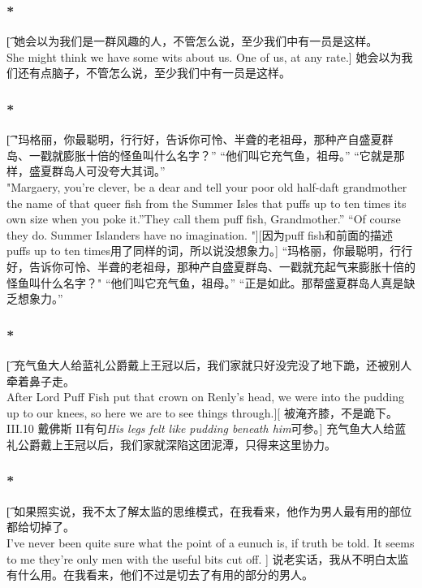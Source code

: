 \documentclass[12pt,a4paper]{article}
\begin{document}
\subsubsection{\color{red}*}\t[
	她会以为我们是一群风趣的人，不管怎么说，至少我们中有一员是这样。\\
	She might think we have some wits about us. One of us, at any rate.]
	她会以为我们还有点脑子，不管怎么说，至少我们中有一员是这样。
	
\subsubsection{\color{red}*}\t[
	"玛格丽，你最聪明，行行好，告诉你可怜、半聋的老祖母，那种产自盛夏群岛、一戳就膨胀十倍的怪鱼叫什么名字？” “他们叫它充气鱼，祖母。” “它就是那样，盛夏群岛人可没夸大其词。”\\
	"Margaery, you're clever, be a dear and tell your poor old half-daft grandmother the name of that queer fish from the Summer Isles that puffs up to ten times its own size when you poke it.”They call them puff fish, Grandmother.” “Of course they do. Summer Islanders have no imagination. "][因为puff fish和前面的描述puffs up to ten times用了同样的词，所以说没想象力。]
	“玛格丽，你最聪明，行行好，告诉你可怜、半聋的老祖母，那种产自盛夏群岛、一戳就充起气来膨胀十倍的怪鱼叫什么名字？" “他们叫它充气鱼，祖母。” “正是如此。那帮盛夏群岛人真是缺乏想象力。”
	
\subsubsection{\color{red}*}\t[
	充气鱼大人给蓝礼公爵戴上王冠以后，我们家就只好没完没了地下跪，还被别人牵着鼻子走。\\
	After Lord Puff Fish put that crown on Renly's head, we were into the pudding up to our knees, so here we are to see things through.][
	被淹齐膝，不是跪下。III.10 戴佛斯 II有句\emph{His legs felt like pudding beneath him}可参。]
	充气鱼大人给蓝礼公爵戴上王冠以后，我们家就深陷这团泥潭，只得来这里协力。
	
\subsubsection{\color{red}*}\t[
	如果照实说，我不太了解太监的思维模式，在我看来，他作为男人最有用的部位都给切掉了。\\
		I've never been quite sure what the point of a eunuch is, if truth be told. It seems to me they're only men with the useful bits cut off. ]
		说老实话，我从不明白太监有什么用。在我看来，他们不过是切去了有用的部分的男人。
		
\end{document}
